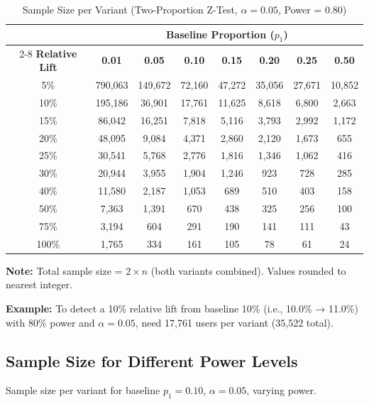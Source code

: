 \begin{table}[h]
\centering
\caption{Sample Size per Variant (Two-Proportion Z-Test, $\alpha = 0.05$, Power = 0.80)}
\small
\begin{tabular}{c|ccccccc}
\toprule
& \multicolumn{7}{c}{\textbf{Baseline Proportion ($p_1$)}} \\
\cmidrule{2-8}
\textbf{Relative Lift} & \textbf{0.01} & \textbf{0.05} & \textbf{0.10} & \textbf{0.15} & \textbf{0.20} & \textbf{0.25} & \textbf{0.50} \\
\midrule
5\% & 790,063 & 149,672 & 72,160 & 47,272 & 35,056 & 27,671 & 10,852 \\
10\% & 195,186 & 36,901 & 17,761 & 11,625 & 8,618 & 6,800 & 2,663 \\
15\% & 86,042 & 16,251 & 7,818 & 5,116 & 3,793 & 2,992 & 1,172 \\
20\% & 48,095 & 9,084 & 4,371 & 2,860 & 2,120 & 1,673 & 655 \\
25\% & 30,541 & 5,768 & 2,776 & 1,816 & 1,346 & 1,062 & 416 \\
30\% & 20,944 & 3,955 & 1,904 & 1,246 & 923 & 728 & 285 \\
40\% & 11,580 & 2,187 & 1,053 & 689 & 510 & 403 & 158 \\
50\% & 7,363 & 1,391 & 670 & 438 & 325 & 256 & 100 \\
75\% & 3,194 & 604 & 291 & 190 & 141 & 111 & 43 \\
100\% & 1,765 & 334 & 161 & 105 & 78 & 61 & 24 \\
\bottomrule
\end{tabular}
\end{table}

\textbf{Note:} Total sample size = $2 \times n$ (both variants combined). Values rounded to nearest integer.

\vspace{0.5cm}

\textbf{Example:} To detect a 10\% relative lift from baseline 10\% (i.e., 10.0\% → 11.0\%) with 80\% power and $\alpha = 0.05$, need 17,761 users per variant (35,522 total).

\subsection{Sample Size for Different Power Levels}

Sample size per variant for baseline $p_1 = 0.10$, $\alpha = 0.05$, varying power.


